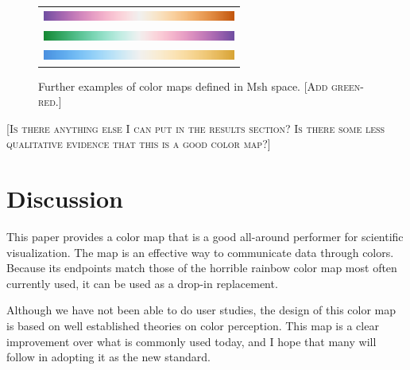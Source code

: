 \documentclass{vgtc}                          %
\newcommand{\sticky}[1]{\textsc{[#1]}}
\newcommand{\Msh}{Msh\xspace}
\begin{document}
\begin{figure}
  \centering
  \begin{tabular}{c}
    \includegraphics[width=2.5in]{images/Purple2OrangeBar} \\
    \includegraphics[width=2.5in]{images/Green2PurpleBar} \\
    \includegraphics[width=2.5in]{images/Blue2TanBar}
  \end{tabular}
  \caption{Further examples of color maps defined in \Msh
  space. \sticky{Add green-red.}}
  \label{fig:OtherColorMaps}
\end{figure}

\sticky{Is there anything else I can put in the results section?  Is there
  some less qualitative evidence that this is a good color map?}


\section{Discussion}
\label{sec:Discussion}

This paper provides a color map that is a good all-around performer for
scientific visualization.  The map is an effective way to communicate data
through colors.  Because its endpoints match those of the horrible rainbow
color map most often currently used, it can be used as a drop-in
replacement.

Although we have not been able to do user studies, the design of this color
map is based on well established theories on color perception.  This map is
a clear improvement over what is commonly used today, and I hope that many
will follow in adopting it as the new standard.





\end{document}
